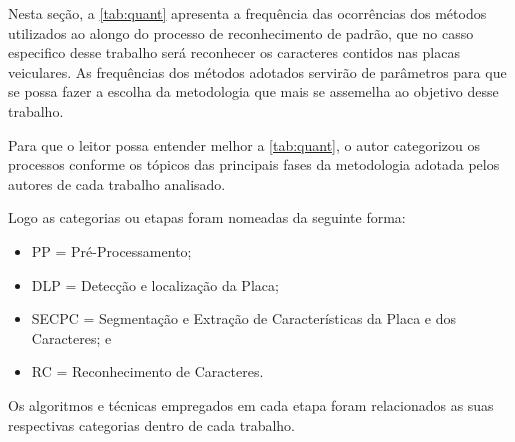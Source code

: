 Nesta seção, a \autoref{tab:quant} apresenta a frequência das ocorrências dos métodos utilizados ao alongo do processo de reconhecimento de padrão, que no casso especifico desse trabalho será reconhecer os caracteres contidos nas placas veiculares. As frequências dos métodos adotados servirão de parâmetros para que se possa fazer a escolha da metodologia que mais se assemelha ao objetivo desse trabalho.

Para que o leitor possa entender melhor a \autoref{tab:quant}, o autor categorizou os processos conforme os tópicos das principais fases da metodologia adotada pelos autores de cada trabalho analisado.

Logo as categorias ou etapas foram nomeadas da seguinte forma: 

\begin{itemize}
	\item PP = Pré-Processamento;
	\item DLP = Detecção e localização da Placa;
	\item SECPC = Segmentação e Extração de Características da Placa e dos Caracteres; e
	\item RC = Reconhecimento de Caracteres.
\end{itemize}

Os algoritmos e técnicas empregados em cada etapa foram relacionados as suas respectivas categorias dentro de cada trabalho.

